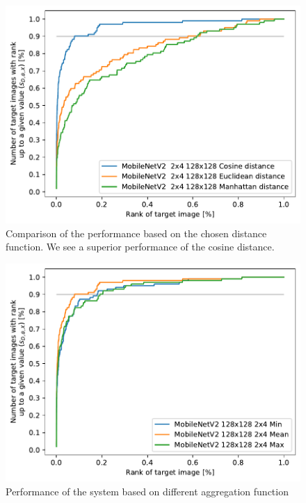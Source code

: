 \begin{figure}
    \centering
    \includegraphics[width=0.8\linewidth]{graphs/3aab502ea602a9f49afaa0a0d998cf226a0a67b9efcaa655d2ddf5063eeabe47.pdf}
    \caption[Comparison of the performance based on the chosen distance function]{Comparison of the performance based on the chosen distance function. We see a superior performance of the cosine distance.}
    \label{fig:regions_distances}
\end{figure}

\begin{figure}
\centering
\includegraphics[width=0.8\linewidth]{graphs/70c56dc52be92e048f57b9bdfb35ddce2be41fd2454ae360588da2e387b09de5.pdf}
\caption{Performance of the system based on different aggregation function}
\label{fig:ranking_funcs}
\end{figure}

